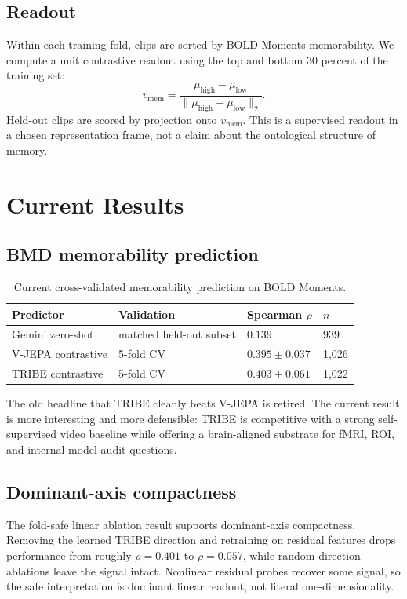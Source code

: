 \documentclass[11pt]{article}
\begin{document}
\subsection{Readout}

Within each training fold, clips are sorted by BOLD Moments memorability. We
compute a unit contrastive readout using the top and bottom 30 percent of the
training set:
\[
v_{\mathrm{mem}} =
\frac{\mu_{\mathrm{high}}-\mu_{\mathrm{low}}}
{\lVert\mu_{\mathrm{high}}-\mu_{\mathrm{low}}\rVert_2}.
\]
Held-out clips are scored by projection onto $v_{\mathrm{mem}}$. This is a
supervised readout in a chosen representation frame, not a claim about the
ontological structure of memory.

\section{Current Results}

\subsection{BMD memorability prediction}

\begin{table}[h]
\centering
\caption{Current cross-validated memorability prediction on BOLD Moments.}
\begin{tabular}{llll}
\toprule
Predictor & Validation & Spearman $\rho$ & $n$ \\
\midrule
Gemini zero-shot & matched held-out subset & $0.139$ & 939 \\
V-JEPA contrastive & 5-fold CV & $0.395\pm0.037$ & 1,026 \\
TRIBE contrastive & 5-fold CV & $0.403\pm0.061$ & 1,022 \\
\bottomrule
\end{tabular}
\end{table}

The old headline that TRIBE cleanly beats V-JEPA is retired. The current result
is more interesting and more defensible: TRIBE is competitive with a strong
self-supervised video baseline while offering a brain-aligned substrate for
fMRI, ROI, and internal model-audit questions.

\subsection{Dominant-axis compactness}

The fold-safe linear ablation result supports dominant-axis compactness. Removing
the learned TRIBE direction and retraining on residual features drops
performance from roughly $\rho=0.401$ to $\rho=0.057$, while random direction
ablations leave the signal intact. Nonlinear residual probes recover some
signal, so the safe interpretation is dominant linear readout, not literal
one-dimensionality.
\end{document}
